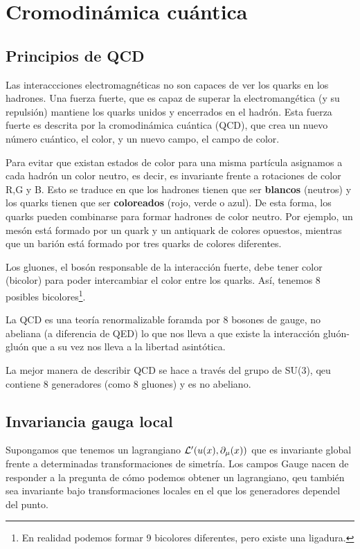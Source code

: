 \chapter{Cromodinámica cuántica}

\section{Principios de QCD}

Las interaccciones electromagnéticas no son capaces de ver los quarks en los hadrones. Una fuerza fuerte, que es capaz de superar la electromangética (y su repulsión) mantiene los quarks unidos y encerrados en el hadrón. Esta fuerza fuerte es descrita por la cromodinámica cuántica (QCD), que crea un nuevo número cuántico, el color, y un nuevo campo, el campo de color.

Para evitar que existan estados de color para una misma partícula asignamos a cada hadrón un color neutro, es decir, es invariante frente a rotaciones de color R,G y B. Esto se traduce en que los hadrones tienen que ser \textbf{blancos} (neutros) y los quarks tienen que ser \textbf{coloreados} (rojo, verde o azul). De esta forma, los quarks pueden combinarse para formar hadrones de color neutro. Por ejemplo, un mesón está formado por un quark y un antiquark de colores opuestos, mientras que un barión está formado por tres quarks de colores diferentes.

Los gluones, el bosón responsable de la interacción fuerte, debe tener color (bicolor) para poder intercambiar el color entre los quarks. Así, tenemos 8 posibles bicolores\footnote{En realidad podemos formar 9 bicolores diferentes, pero existe una ligadura.}.

La QCD es una teoría renormalizable foramda por 8 bosones de gauge, no abeliana (a diferencia de QED) lo que nos lleva a que existe la interacción gluón-gluón que a su vez nos lleva a la libertad asintótica. 


La mejor manera de describir QCD se hace a través del grupo de SU(3), qeu contiene 8 generadores (como 8 gluones) y es no abeliano. 

\section{Invariancia gauga local}

Supongamos que tenemos un lagrangiano $\mathcal{L}'(u(x),\partial_\mu (x))$ que es invariante global frente a determinadas transformaciones de simetría. Los campos Gauge nacen de responder a la pregunta de cómo podemos obtener un lagrangiano, qeu también sea invariante bajo transformaciones locales en el que los generadores dependel del punto. 


